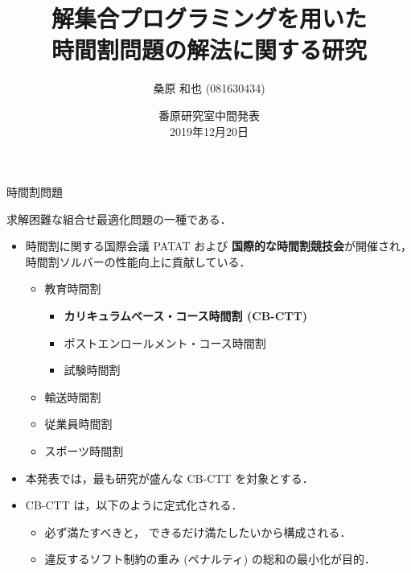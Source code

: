 \documentclass[11pt,dvipdfmx]{beamer}
\title{解集合プログラミングを用いた\\時間割問題の解法に関する研究}
\author{桑原 和也 (081630434)}
\institute{名古屋大学工学部電気電子・情報学科情報コース}
\date{番原研究室中間発表\\2019年12月20日}
\begin{document}
\maketitle
\begin{frame}{時間割問題}
  \begin{block}{}\centering
    求解困難な組合せ最適化問題の一種である．
  \end{block}
  \begin{itemize}
  \item 時間割に関する国際会議 PATAT および
    \alert{\bf 国際的な時間割競技会}が開催され，
    時間割ソルバーの性能向上に貢献している．
    \begin{itemize}
    \item 教育時間割
      \begin{itemize}
      \item \alert{\bf カリキュラムベース・コース時間割 (CB-CTT)}
      \item ポストエンロールメント・コース時間割
      \item 試験時間割
      \end{itemize}
    \item 輸送時間割
    \item 従業員時間割
    \item スポーツ時間割
    \end{itemize}
  \item 本発表では，最も研究が盛んな CB-CTT を対象とする．
  \item CB-CTT は，以下のように定式化される．
    \begin{itemize}
    \item 必ず満たすべきと，
      できるだけ満たしたいから構成される．
    \item 違反するソフト制約の重み (ペナルティ) の総和の最小化が目的．
    \end{itemize}
  \end{itemize}
\end{frame}
\end{document}
